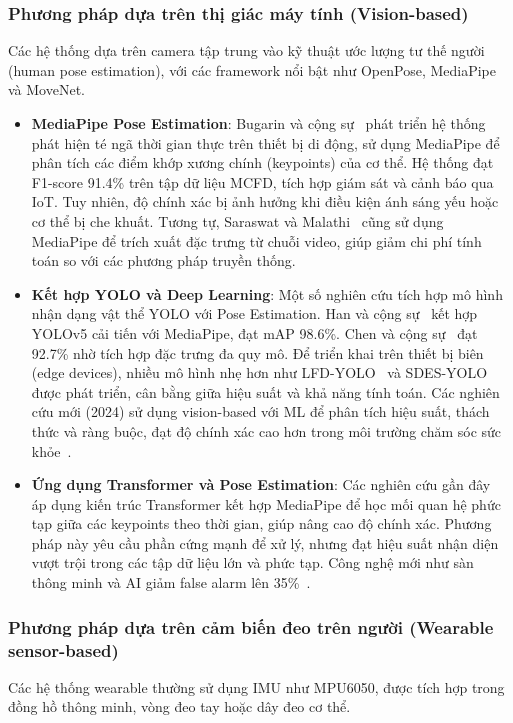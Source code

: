 \subsubsection{Phương pháp dựa trên thị giác máy tính (Vision-based)}
Các hệ thống dựa trên camera tập trung vào kỹ thuật ước lượng tư thế người (human pose estimation), với các framework nổi bật như OpenPose, MediaPipe và MoveNet. 

\begin{itemize}
    \item \textbf{MediaPipe Pose Estimation}: Bugarin và cộng sự~\cite{bugarin2022} phát triển hệ thống phát hiện té ngã thời gian thực trên thiết bị di động, sử dụng MediaPipe để phân tích các điểm khớp xương chính (keypoints) của cơ thể. Hệ thống đạt F1-score 91.4\% trên tập dữ liệu MCFD, tích hợp giám sát và cảnh báo qua IoT. Tuy nhiên, độ chính xác bị ảnh hưởng khi điều kiện ánh sáng yếu hoặc cơ thể bị che khuất. Tương tự, Saraswat và Malathi~\cite{saraswat2024} cũng sử dụng MediaPipe để trích xuất đặc trưng từ chuỗi video, giúp giảm chi phí tính toán so với các phương pháp truyền thống.  
    \item \textbf{Kết hợp YOLO và Deep Learning}: Một số nghiên cứu tích hợp mô hình nhận dạng vật thể YOLO với Pose Estimation. Han và cộng sự~\cite{han2024} kết hợp YOLOv5 cải tiến với MediaPipe, đạt mAP 98.6\%. Chen và cộng sự~\cite{chen2022} đạt 92.7\% nhờ tích hợp đặc trưng đa quy mô. Để triển khai trên thiết bị biên (edge devices), nhiều mô hình nhẹ hơn như LFD-YOLO~\cite{lfdyolo2025} và SDES-YOLO~\cite{sdesyolo2025} được phát triển, cân bằng giữa hiệu suất và khả năng tính toán. Các nghiên cứu mới (2024) sử dụng vision-based với ML để phân tích hiệu suất, thách thức và ràng buộc, đạt độ chính xác cao hơn trong môi trường chăm sóc sức khỏe~\cite{mlvision2024}.
    \item \textbf{Ứng dụng Transformer và Pose Estimation}: Các nghiên cứu gần đây~\cite{stylios2024, zhang2022, pmc2024} áp dụng kiến trúc Transformer kết hợp MediaPipe để học mối quan hệ phức tạp giữa các keypoints theo thời gian, giúp nâng cao độ chính xác. Phương pháp này yêu cầu phần cứng mạnh để xử lý, nhưng đạt hiệu suất nhận diện vượt trội trong các tập dữ liệu lớn và phức tạp. Công nghệ mới như sàn thông minh và AI giảm false alarm lên 35\%~\cite{smartfloor2024}.
\end{itemize}

\subsubsection{Phương pháp dựa trên cảm biến đeo trên người (Wearable sensor-based)}
Các hệ thống wearable thường sử dụng IMU như MPU6050, được tích hợp trong đồng hồ thông minh, vòng đeo tay hoặc dây đeo cơ thể. 

